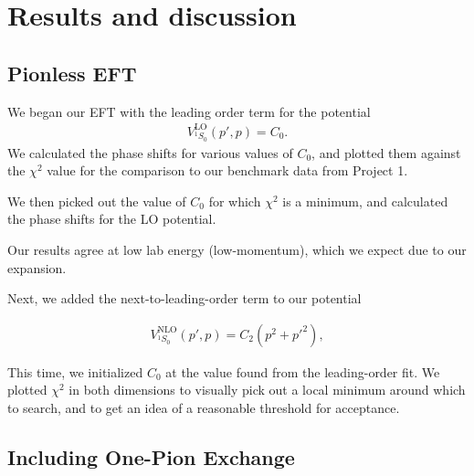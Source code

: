\documentclass[10pt,showpacs,preprintnumbers,footinbib,amsmath,amssymb,aps,prl,twocolumn,groupedaddress,superscriptaddress,showkeys]{revtex4-1}
\begin{document}
\section{Results and discussion}

\subsection{Pionless EFT}
We began our EFT with the leading order term for the potential
\begin{equation}
\begin{split}
V^\mathrm{LO}_{^1S_0}(p',p)=C_0.
\end{split}
\end{equation}
We calculated the phase shifts for various values of $C_0$, and plotted them against the
$\chi^2$ value for the comparison to our benchmark data from Project 1. 


We then picked out the value of $C_0$ for which $\chi^2$ is a minimum, and calculated
the phase shifts for the LO potential.

Our results agree at low lab energy (low-momentum), which we expect due to our expansion. 

Next, we added the next-to-leading-order term to our potential

\begin{equation}
\begin{split}
V^\mathrm{NLO}_{^1S_0}(p',p)=C_2(p^2 + p'^2),
\end{split}
\end{equation}

This time, we initialized $C_0$ at the value found from the leading-order fit. We plotted
$\chi^2$ in both dimensions to visually pick out a local minimum around which to search,
and to get an idea of a reasonable threshold for acceptance.

\subsection{Including One-Pion Exchange}


\end{document}
